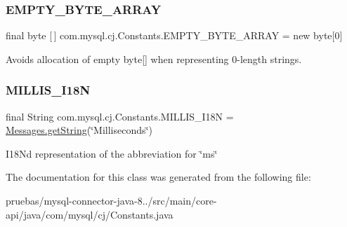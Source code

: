 \subsubsection{\texorpdfstring{E\+M\+P\+T\+Y\+\_\+\+B\+Y\+T\+E\+\_\+\+A\+R\+R\+AY}{EMPTY\_BYTE\_ARRAY}}
{\footnotesize\ttfamily final byte \mbox{[}$\,$\mbox{]} com.\+mysql.\+cj.\+Constants.\+E\+M\+P\+T\+Y\+\_\+\+B\+Y\+T\+E\+\_\+\+A\+R\+R\+AY = new byte\mbox{[}0\mbox{]}\hspace{0.3cm}{\ttfamily [static]}}

Avoids allocation of empty byte\mbox{[}\mbox{]} when representing 0-\/length strings. \mbox{\label{classcom_1_1mysql_1_1cj_1_1_constants_a8fc1f3a520cd5d66593984337c90ce3a}} 
\subsubsection{\texorpdfstring{M\+I\+L\+L\+I\+S\+\_\+\+I18N}{MILLIS\_I18N}}
{\footnotesize\ttfamily final String com.\+mysql.\+cj.\+Constants.\+M\+I\+L\+L\+I\+S\+\_\+\+I18N = \mbox{\hyperlink{classcom_1_1mysql_1_1cj_1_1_messages_a86a388448aa7759254c491b3e1320d31}{Messages.\+get\+String}}(\char`\"{}Milliseconds\char`\"{})\hspace{0.3cm}{\ttfamily [static]}}

I18N\textquotesingle{}d representation of the abbreviation for \char`\"{}ms\char`\"{} 

The documentation for this class was generated from the following file\+:\begin{DoxyCompactItemize}
\item 
pruebas/mysql-\/connector-\/java-\/8../src/main/core-\/api/java/com/mysql/cj/Constants.\+java\end{DoxyCompactItemize}
